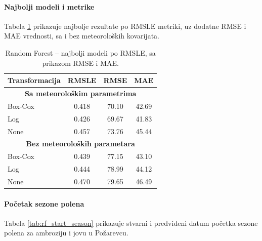 \documentclass[12pt]{article}
\begin{document}
\paragraph{\textbf{Najbolji modeli i metrike}}  
Tabela \ref{tab:rf_best_models} prikazuje najbolje rezultate po RMSLE metriki, uz dodatne RMSE i MAE vrednosti, sa i bez meteoroloških kovarijata.

\begin{table}[h!]
\centering
\caption{Random Forest – najbolji modeli po RMSLE, sa prikazom RMSE i MAE.}
\label{tab:rf_best_models}
\renewcommand{\arraystretch}{1.2}
\begin{tabular}{|l|c|c|c|}
\hline
\textbf{Transformacija} & \textbf{RMSLE} & \textbf{RMSE} & \textbf{MAE} \\ \hline
\multicolumn{4}{|c|}{\textbf{Sa meteorološkim parametrima}} \\ \hline
Box-Cox & 0.418 & 70.10 & 42.69 \\ \hline
Log     & 0.426 & 69.67 & 41.83 \\ \hline
None    & 0.457 & 73.76 & 45.44 \\ \hline
\multicolumn{4}{|c|}{\textbf{Bez meteoroloških parametara}} \\ \hline
Box-Cox & 0.439 & 77.15 & 43.10 \\ \hline
Log     & 0.444 & 78.99 & 44.12 \\ \hline
None    & 0.470 & 79.65 & 46.49 \\ \hline
\end{tabular}
\end{table}

\paragraph{\textbf{Početak sezone polena}}
Tabela \ref{tab:rf_start_season} prikazuje stvarni i predviđeni datum početka sezone polena za ambroziju i jovu u Požarevcu.
\end{document}
